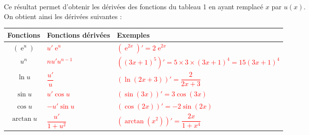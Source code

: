 \documentclass[11pt,a4paper]{article}
\DeclareMathOperator{\e}{e}
\begin{document}
Ce résultat permet d'obtenir les dérivées des fonctions du tableau 1 en ayant remplacé $x$ par $u(x)$. \\[0.2 cm]
On obtient ainsi les dérivées suivantes : \\

\begin{center}
{
\renewcommand{\arraystretch}{2.7}
\begin{tabularx}{1\linewidth}{|>{\centering\arraybackslash}c||>{\centering\arraybackslash}p{3.5cm}|||>{\centering\arraybackslash}X|}
\hline
Fonctions & Fonctions dérivées & Exemples \\
\hline
$\left(\e^u\right)$ & \textcolor{red}{$u'\e^u$} & \textcolor{red}{$\left(\e^{2x}\right)' = 2\e^{2x}$} \\
\hline
$u^n$ & \textcolor{red}{$nu'u^{n-1}$} & \textcolor{red}{$\left((3x+1)^5\right)' = 5 \times 3 \times (3x+1)^4 = 15(3x+1)^4$} \\
\hline
$\ln u$ & \textcolor{red}{$\dfrac{u'}{u}$} & \textcolor{red}{$\left(\ln(2x+3)\right)' = \dfrac{2}{2x+3}$} \\
\hline
$\sin u$ & \textcolor{red}{$u'\cos u$} & \textcolor{red}{$\left(\sin(3x)\right)' = 3\cos(3x)$} \\
\hline
$\cos u$ & \textcolor{red}{$-u'\sin u$} & \textcolor{red}{$\left(\cos(2x)\right)' = -2\sin(2x)$} \\
\hline
$\arctan u$ & \textcolor{red}{$\dfrac{u'}{1+u^2}$} & \textcolor{red}{$\left(\arctan(x^2)\right)' = \dfrac{2x}{1+x^4}$} \\
\hline
\end{tabularx}
}
\end{center}

\newpage
\end{document}
